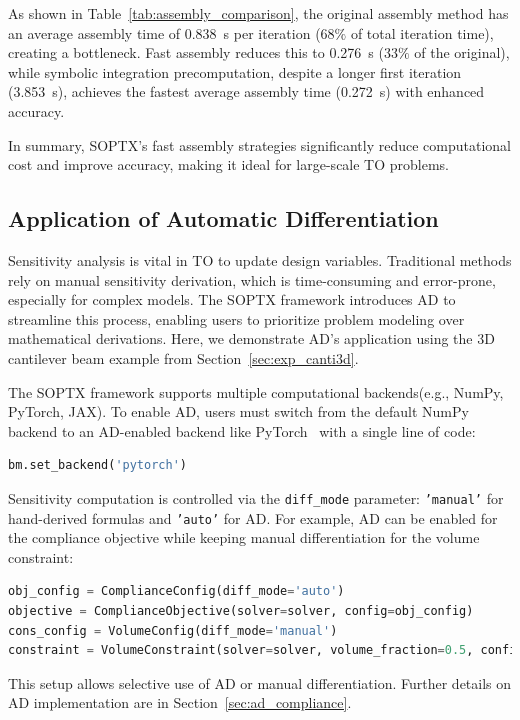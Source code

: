 \documentclass[mathpazo]{cicp}
\begin{document}
As shown in Table~\ref{tab:assembly_comparison}, the original assembly method has an average assembly time of \SI{0.838}{s} per iteration ($68\%$ of total iteration time), creating a bottleneck. Fast assembly reduces this to \SI{0.276}{s} ($33\%$ of the original), while symbolic integration precomputation, despite a longer first iteration (\SI{3.853}{s}), achieves the fastest average assembly time (\SI{0.272}{s}) with enhanced accuracy.

In summary, SOPTX's fast assembly strategies significantly reduce computational cost and improve accuracy, making it ideal for large-scale TO problems.

\subsection{Application of Automatic Differentiation}\label{sec:exp_canti3d_ad}
Sensitivity analysis is vital in TO to update design variables. Traditional methods rely on manual sensitivity derivation, which is time-consuming and error-prone, especially for complex models. The SOPTX framework introduces AD to streamline this process, enabling users to prioritize problem modeling over mathematical derivations. Here, we demonstrate AD’s application using the 3D cantilever beam example from Section~\ref{sec:exp_canti3d}.

The SOPTX framework supports multiple computational backends(e.g., NumPy, PyTorch, JAX). To enable AD, users must switch from the default NumPy backend to an AD-enabled backend like PyTorch~\cite{paszke2017automatic} with a single line of code:
\vspace{-0.5ex} %
\begin{lstlisting}[language=python]
bm.set_backend('pytorch')
\end{lstlisting}
\vspace{-0.5ex} %

Sensitivity computation is controlled via the \texttt{diff\_mode} parameter: \texttt{'manual'} for hand-derived formulas and \texttt{'auto'} for AD. For example, AD can be enabled for the compliance objective while keeping manual differentiation for the volume constraint:
\vspace{-0.5ex} %
\begin{lstlisting}[language=python]
obj_config = ComplianceConfig(diff_mode='auto')
objective = ComplianceObjective(solver=solver, config=obj_config)
cons_config = VolumeConfig(diff_mode='manual')
constraint = VolumeConstraint(solver=solver, volume_fraction=0.5, config=cons_config)
\end{lstlisting}
\vspace{-0.5ex} %
This setup allows selective use of AD or manual differentiation. Further details on AD implementation are in Section~\ref{sec:ad_compliance}.
\end{document}
